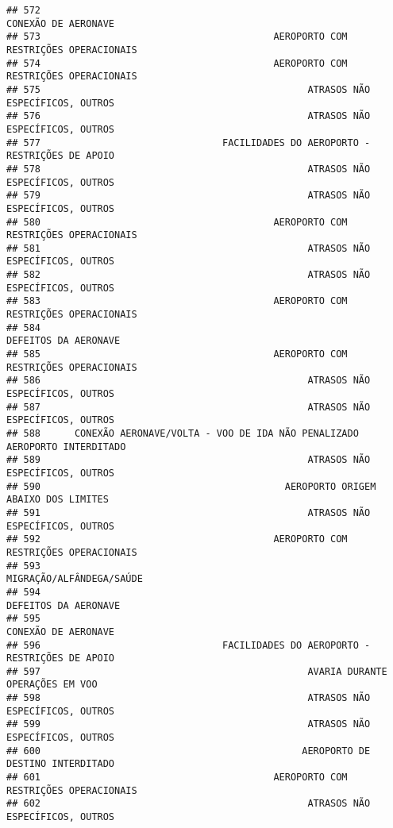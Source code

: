 \documentclass[
]{article}
\begin{document}
\begin{verbatim}
## 572                                                           CONEXÃO DE AERONAVE
## 573                                         AEROPORTO COM RESTRIÇÕES OPERACIONAIS
## 574                                         AEROPORTO COM RESTRIÇÕES OPERACIONAIS
## 575                                               ATRASOS NÃO ESPECÍFICOS, OUTROS
## 576                                               ATRASOS NÃO ESPECÍFICOS, OUTROS
## 577                                FACILIDADES DO AEROPORTO - RESTRIÇÕES DE APOIO
## 578                                               ATRASOS NÃO ESPECÍFICOS, OUTROS
## 579                                               ATRASOS NÃO ESPECÍFICOS, OUTROS
## 580                                         AEROPORTO COM RESTRIÇÕES OPERACIONAIS
## 581                                               ATRASOS NÃO ESPECÍFICOS, OUTROS
## 582                                               ATRASOS NÃO ESPECÍFICOS, OUTROS
## 583                                         AEROPORTO COM RESTRIÇÕES OPERACIONAIS
## 584                                                          DEFEITOS DA AERONAVE
## 585                                         AEROPORTO COM RESTRIÇÕES OPERACIONAIS
## 586                                               ATRASOS NÃO ESPECÍFICOS, OUTROS
## 587                                               ATRASOS NÃO ESPECÍFICOS, OUTROS
## 588      CONEXÃO AERONAVE/VOLTA - VOO DE IDA NÃO PENALIZADO AEROPORTO INTERDITADO
## 589                                               ATRASOS NÃO ESPECÍFICOS, OUTROS
## 590                                           AEROPORTO ORIGEM ABAIXO DOS LIMITES
## 591                                               ATRASOS NÃO ESPECÍFICOS, OUTROS
## 592                                         AEROPORTO COM RESTRIÇÕES OPERACIONAIS
## 593                                                      MIGRAÇÃO/ALFÂNDEGA/SAÚDE
## 594                                                          DEFEITOS DA AERONAVE
## 595                                                           CONEXÃO DE AERONAVE
## 596                                FACILIDADES DO AEROPORTO - RESTRIÇÕES DE APOIO
## 597                                               AVARIA DURANTE OPERAÇÕES EM VOO
## 598                                               ATRASOS NÃO ESPECÍFICOS, OUTROS
## 599                                               ATRASOS NÃO ESPECÍFICOS, OUTROS
## 600                                              AEROPORTO DE DESTINO INTERDITADO
## 601                                         AEROPORTO COM RESTRIÇÕES OPERACIONAIS
## 602                                               ATRASOS NÃO ESPECÍFICOS, OUTROS

\end{verbatim}
\end{document}

